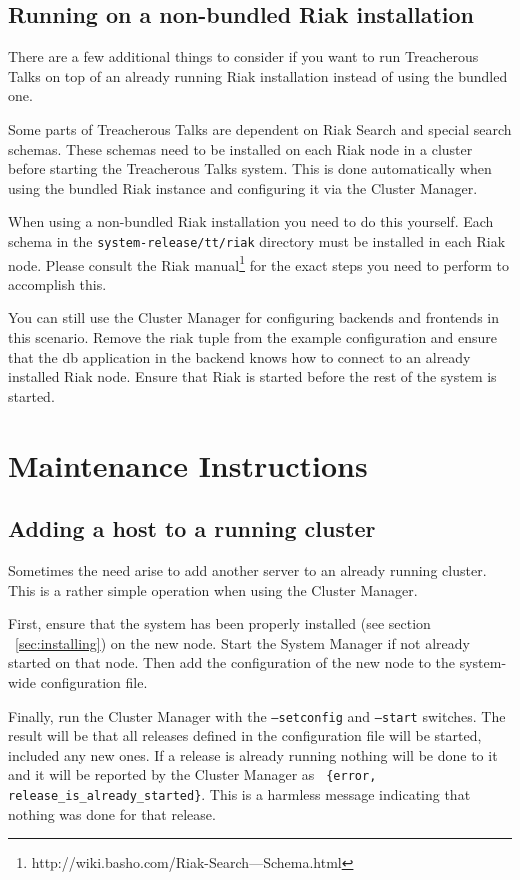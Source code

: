 \documentclass[11pt,a4paper]{report}
\begin{document}
\section{Running on a non-bundled Riak installation}
There are a few additional things to consider if you want to run Treacherous
Talks on top of an already running Riak installation instead of using the
bundled one.

Some parts of Treacherous Talks are dependent on Riak Search and special search
schemas. These schemas need to be installed on each Riak node in a cluster
before starting the Treacherous Talks system. This is done automatically when
using the bundled Riak instance and configuring it via the Cluster Manager.

When using a non-bundled Riak installation you need to do this yourself. Each
schema in the {\tt system-release/tt/riak} directory must be installed in each
Riak node. Please consult the Riak manual\footnote{http://wiki.basho.com/Riak-Search---Schema.html}
for the exact steps you need to perform to accomplish this.

You can still use the Cluster Manager for configuring backends and frontends in
this scenario. Remove the riak tuple from the example configuration and ensure
that the db application in the backend knows how to connect to an already
installed Riak node. Ensure that Riak is started before the rest of the system
is started.
\chapter{Maintenance Instructions}
\section{Adding a host to a running cluster}
Sometimes the need arise to add another server to an already running
cluster. This is a rather simple operation when using the Cluster Manager.

First, ensure that the system has been properly installed (see section
~\ref{sec:installing}) on the new node. Start the System Manager if not already
started on that node. Then add the configuration of the new node to the
system-wide configuration file.

Finally, run the Cluster Manager with the {\tt --setconfig} and {\tt --start}
switches. The result will be that all releases defined in the configuration file
will be started, included any new ones. If a release is already running nothing
will be done to it and it will be reported by the Cluster Manager as {\tt
  \{error, release\_is\_already\_started\}}. This is a harmless message
indicating that nothing was done for that release.
\end{document}
